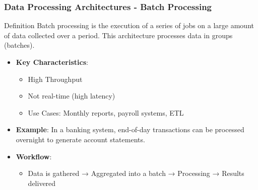 \documentclass[aspectratio=169]{beamer}
\begin{document}
\begin{frame}[fragile]
    \frametitle{Data Processing Architectures - Batch Processing}
    
    \begin{block}{Definition}
        Batch processing is the execution of a series of jobs on a large amount of data collected over a period. This architecture processes data in groups (batches).
    \end{block}
    
    \begin{itemize}
        \item \textbf{Key Characteristics}:
        \begin{itemize}
            \item High Throughput
            \item Not real-time (high latency)
            \item Use Cases: Monthly reports, payroll systems, ETL
        \end{itemize}
        
        \item \textbf{Example}: In a banking system, end-of-day transactions can be processed overnight to generate account statements.
        
        \item \textbf{Workflow}:
        \begin{itemize}
            \item Data is gathered → Aggregated into a batch → Processing → Results delivered
        \end{itemize}
    \end{itemize}
\end{frame}
\end{document}

